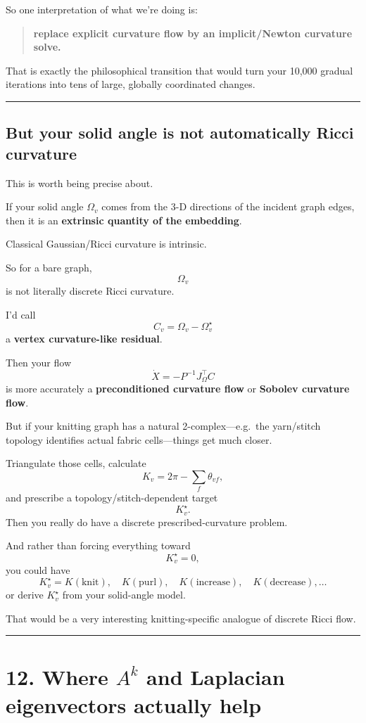 \documentclass[11pt]{article}
\begin{document}
So one interpretation of what we're doing is:
\begin{quote}
\textbf{replace explicit curvature flow by an implicit/Newton curvature
solve.}
\end{quote}
That is exactly the philosophical transition that would turn your 10,000
gradual iterations into tens of large, globally coordinated changes.

\bigskip\hrule

\subsection*{But your solid angle is not automatically Ricci curvature}

This is worth being precise about.

If your solid angle \(\Omega_v\) comes from the 3-D directions of the
incident graph edges, then it is an \textbf{extrinsic quantity of the
embedding}.

Classical Gaussian/Ricci curvature is intrinsic.

So for a bare graph,
\[
\Omega_v
\]
is not literally discrete Ricci curvature.

I'd call
\[
C_v=\Omega_v-\Omega_v^\star
\]
a \textbf{vertex curvature-like residual}.

Then your flow
\[
\dot X
=
-
P^{-1}
J_\Omega^\top C
\]
is more accurately a \textbf{preconditioned curvature flow} or
\textbf{Sobolev curvature flow}.

But if your knitting graph has a natural 2-complex---e.g.\ the yarn/stitch
topology identifies actual fabric cells---things get much closer.

Triangulate those cells, calculate
\[
K_v=2\pi-\sum_f\theta_{vf},
\]
and prescribe a topology/stitch-dependent target
\[
K_v^\star.
\]
Then you really do have a discrete prescribed-curvature problem.

And rather than forcing everything toward
\[
K_v^\star=0,
\]
you could have
\[
K_v^\star
=
K(\text{knit}),
\quad
K(\text{purl}),
\quad
K(\text{increase}),
\quad
K(\text{decrease}),
\ldots
\]
or derive \(K_v^\star\) from your solid-angle model.

That would be a very interesting knitting-specific analogue of discrete
Ricci flow.

\bigskip\hrule

\section*{12. Where \(A^k\) and Laplacian eigenvectors actually help}
\end{document}
